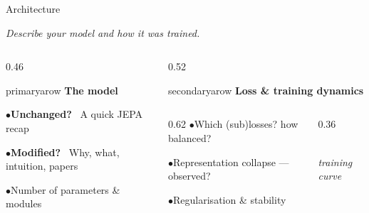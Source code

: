 \documentclass[aspectratio=169]{beamer}
\newcommand{\cardtitle}[2]{\textbf{\color{#1}#2}\par\vspace{5pt}}
\newcommand{\qitem}[1]{\textcolor{secondary}{\footnotesize$\bullet$}\hspace{4pt}#1\par\vspace{3pt}}
\begin{document}
\begin{frame}{Architecture}
  \begin{center}
    \small\itshape Describe your model and how it was trained.
  \end{center}
  \vspace{0.35cm}
 
  \begin{columns}[T]
    \begin{column}{0.46\textwidth}
      \begin{qbox}{primary}{arow}
        \cardtitle{primary}{The model}
        \footnotesize
        \qitem{\textbf{Unchanged?} \, A quick JEPA recap}
        \qitem{\textbf{Modified?} \, Why, what, intuition, papers}
        \qitem{Number of parameters \& modules}
      \end{qbox}
    \end{column}
 
    \begin{column}{0.52\textwidth}
      \begin{qbox}{secondary}{arow}
        \cardtitle{secondary}{Loss \& training dynamics}
        \footnotesize
        \begin{columns}[c]
          \begin{column}{0.62\textwidth}
            \qitem{Which (sub)losses? how balanced?}
            \qitem{Representation collapse — observed?}
            \qitem{Regularisation \& stability}
          \end{column}
          \begin{column}{0.36\textwidth}
            \centering
            \\[-2pt]
            {\scriptsize\itshape training curve}
          \end{column}
        \end{columns}
      \end{qbox}
    \end{column}
  \end{columns}
\end{frame}
\end{document}
